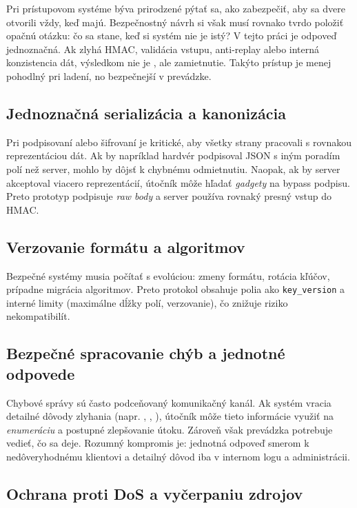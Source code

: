 \documentclass[journal,a4paper,onecolumn]{IEEEtran}
\begin{document}
Pri prístupovom systéme býva prirodzené pýtať sa, ako zabezpečiť, aby sa dvere otvorili vždy, keď majú. Bezpečnostný návrh si však musí rovnako tvrdo položiť opačnú otázku: čo sa stane, keď si systém nie je istý? V tejto práci je odpoveď jednoznačná. Ak zlyhá HMAC, validácia vstupu, anti-replay alebo interná konzistencia dát, výsledkom nie je , ale zamietnutie. Takýto prístup je menej pohodlný pri ladení, no bezpečnejší v prevádzke.

\subsection{Jednoznačná serializácia a kanonizácia}

Pri podpisovaní alebo šifrovaní je kritické, aby všetky strany pracovali s rovnakou reprezentáciou dát. Ak by napríklad hardvér podpisoval JSON s iným poradím polí než server, mohlo by dôjsť k chybnému odmietnutiu. Naopak, ak by server akceptoval viacero reprezentácií, útočník môže hľadať \emph{gadgety} na bypass podpisu. Preto prototyp podpisuje \emph{raw body} a server používa rovnaký presný vstup do HMAC.

\subsection{Verzovanie formátu a algoritmov}

Bezpečné systémy musia počítať s evolúciou: zmeny formátu, rotácia kľúčov, prípadne migrácia algoritmov. Preto protokol obsahuje polia ako \texttt{key\_version} a interné limity (maximálne dĺžky polí, verzovanie), čo znižuje riziko  nekompatibilít.


\subsection{Bezpečné spracovanie chýb a jednotné odpovede}

Chybové správy sú často podceňovaný komunikačný kanál. Ak systém vracia detailné dôvody zlyhania (napr. , , ), útočník môže tieto informácie využiť na \emph{enumeráciu} a postupné zlepšovanie útoku. Zároveň však prevádzka potrebuje vedieť, čo sa deje. Rozumný kompromis je: jednotná odpoveď smerom k nedôveryhodnému klientovi a detailný dôvod iba v internom logu a administrácii.

\subsection{Ochrana proti DoS a vyčerpaniu zdrojov}
\end{document}
